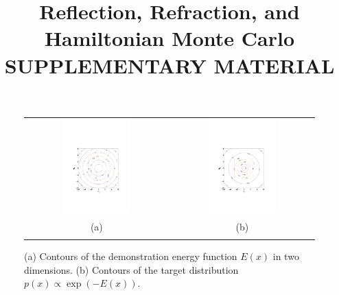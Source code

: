 \documentclass{article} %
\title{Reflection, Refraction, and Hamiltonian Monte Carlo\\\vspace{8pt}SUPPLEMENTARY MATERIAL}
\begin{document}
\maketitle

\begin{figure}
\setlength{\tabcolsep}{0em}
\vspace{-1mm}
\begin{center}
\begin{tabular}{cc}
\includegraphics[trim={3.2cm 6cm 3.2cm 9cm},clip,width=0.49\textwidth]{../plots3/energy_contour.pdf}
& \includegraphics[trim={3.2cm 6cm 3.2cm 9cm},clip,width=0.49\textwidth]{../plots3/dist_contour.pdf} 
\vspace{-3.5mm}
\\
   \footnotesize(a) 
& \footnotesize(b) 
\\
\multicolumn{2}{c}{}
\end{tabular}
\end{center}
\vspace{-8mm}
\caption{\footnotesize
(a) Contours of the demonstration energy function $E(x)$ in two dimensions. (b) Contours of the target distribution $p(x)\propto \exp(-E(x))$.}
\vspace{-10pt}
\end{figure}
\end{document}

